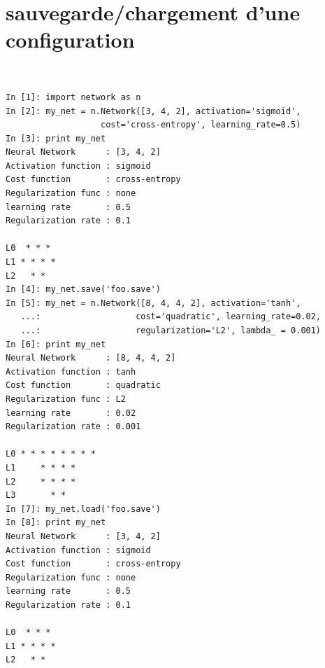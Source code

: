 \documentclass[11pt]{article}
\begin{document}
\section{sauvegarde/chargement d'une configuration}
\label{saveload}
 \\
\begin{lstlisting}
In [1]: import network as n
In [2]: my_net = n.Network([3, 4, 2], activation='sigmoid',
                   cost='cross-entropy', learning_rate=0.5)
In [3]: print my_net
Neural Network      : [3, 4, 2]
Activation function : sigmoid
Cost function       : cross-entropy
Regularization func : none
learning rate       : 0.5
Regularization rate : 0.1

L0  * * *
L1 * * * *
L2   * *
In [4]: my_net.save('foo.save')
In [5]: my_net = n.Network([8, 4, 4, 2], activation='tanh',
   ...:                   cost='quadratic', learning_rate=0.02,
   ...:				      regularization='L2', lambda_ = 0.001)
In [6]: print my_net
Neural Network      : [8, 4, 4, 2]
Activation function : tanh
Cost function       : quadratic
Regularization func : L2
learning rate       : 0.02
Regularization rate : 0.001

L0 * * * * * * * *
L1     * * * *
L2     * * * *
L3       * *
In [7]: my_net.load('foo.save')
In [8]: print my_net
Neural Network      : [3, 4, 2]
Activation function : sigmoid
Cost function       : cross-entropy
Regularization func : none
learning rate       : 0.5
Regularization rate : 0.1

L0  * * *
L1 * * * *
L2   * *
\end{lstlisting}

\newpage
\end{document}
